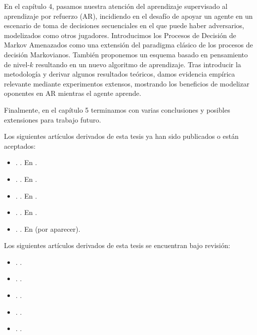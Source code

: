 \documentclass[a4paper, 11pt, openright, twoside]{reportPhD}
\numberwithin{figure}{chapter}
\numberwithin{table}{chapter}
\numberwithin{equation}{chapter}
\begin{document}
En el capítulo 4, pasamos nuestra atención del aprendizaje supervisado al aprendizaje por refuerzo (AR), incidiendo en el desafío de apoyar un agente en un escenario de toma de decisiones secuenciales en el que puede haber adversarios, modelizados como otros jugadores. Introducimos los Procesos de Decisión de Markov Amenazados como una extensión del paradigma clásico de los procesos de decisión Markovianos. También proponemos un esquema basado en pensamiento de nivel-$k$ resultando en un nuevo algoritmo de aprendizaje. Tras introducir la metodología y derivar algunos resultados teóricos, damos evidencia empírica relevante mediante experimentos extensos, mostrando los beneficios de modelizar oponentes en AR mientras el agente aprende.

Finalmente, en el capítulo 5 terminamos con varias conclusiones y posibles extensiones para trabajo futuro.

Los siguientes artículos derivados de esta tesis ya han sido publicados o están aceptados:
\begin{itemize}
    \item \cite{gallego2019dlms}. . En .
    \item \cite{gallego2019reinforcement}. . En .
     \item \cite{gallego2019vis}. . En .   
     \item \cite{math8111957}. . En .
     \item \cite{nn2022}. . En  (por aparecer).
\end{itemize}

Los siguientes artículos derivados de esta tesis se encuentran bajo revisión:
\begin{itemize}
    \item \cite{gallego2019opponent}. . 
        \item \cite{gallego2021data}. . 
    \item \cite{gallego2018stochastic}. . 
    \item \cite{AMLARA}. .
     \item \cite{gallego2020protecting}. . 
\end{itemize}
\end{document}
